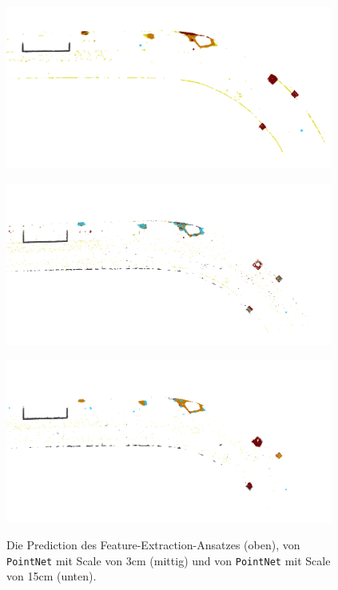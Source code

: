 \begin{figure}
    {\includegraphics[width=0.96\textwidth]{graphics/eval_right_prediction}}
    \par\smallskip
    {\includegraphics[width=0.96\textwidth]{graphics/eval_pointnet_3_right}}
    \par\smallskip
    {\includegraphics[width=0.96\textwidth]{graphics/eval_pointnet_15_right}}
    \caption{Die Prediction des Feature-Extraction-Ansatzes (oben), von \texttt{PointNet} mit Scale von 3cm (mittig) und von \texttt{PointNet} mit Scale von 15cm (unten).}
    \label{fig:cmp_pointnet_right}
\end{figure}

